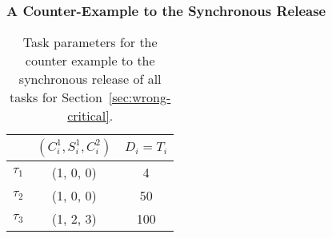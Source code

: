 \subsubsection{A Counter-Example to the Synchronous Release}

\begin{table} 
\centering
    \begin{tabular}{|c|c|c|}
 \hline
        & $(C_i^1, S_i^1, C_i^2)$ &  $D_i=T_i$\\ 
        \hline
        $\tau_1$ & (1, 0, 0) &  4\\ 
        $\tau_2$ &  (1, 0, 0) & 50  \\ 
        $\tau_3$ & (1, 2, 3) & 100  \\
        \hline
    \end{tabular} 
    \caption{Task parameters for the counter example to the synchronous release of all tasks for Section~\ref{sec:wrong-critical}.}
    \label{table:ex-synch-releases}
\end{table}

